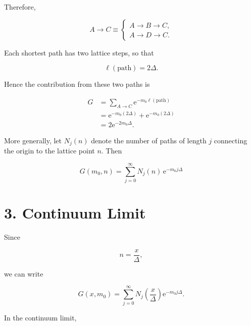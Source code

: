 \documentclass[12pt,a4paper]{article}
\newcommand{\ee}{\mathrm{e}}
\begin{document}
Therefore,

\begin{equation}
    A\to C
    \equiv
    \left\{
    \begin{array}{l}
    A\to B\to C,\\[2mm]
    A\to D\to C.
    \end{array}
    \right.
\end{equation}

Each shortest path has two lattice steps, so that

\begin{equation}
    \ell(\text{path})=2\Delta .
\end{equation}

Hence the contribution from these two paths is

\begin{align}
    G
    &=
    \sum_{A\to C}
    \ee^{-m_0\ell(\text{path})}
    \\
    &=
    \ee^{-m_0(2\Delta)}
    +
    \ee^{-m_0(2\Delta)}
    \\
    &=
    2\ee^{-2m_0\Delta}.
\end{align}

More generally, let $N_j(n)$ denote the number of paths of length
$j$ connecting the origin to the lattice point $n$. Then

\begin{equation}
    \boxed{
    G(m_0,n)
    =
    \sum_{j=0}^{\infty}
    N_j(n)\,
    \ee^{-m_0j\Delta}
    }
\end{equation}


\section*{3. Continuum Limit}

Since

\begin{equation}
    n=\frac{x}{\Delta},
\end{equation}

we can write

\begin{equation}
    G(x,m_0)
    =
    \sum_{j=0}^{\infty}
    N_j\left(\frac{x}{\Delta}\right)
    \ee^{-m_0j\Delta}.
\end{equation}

In the continuum limit,
\end{document}
